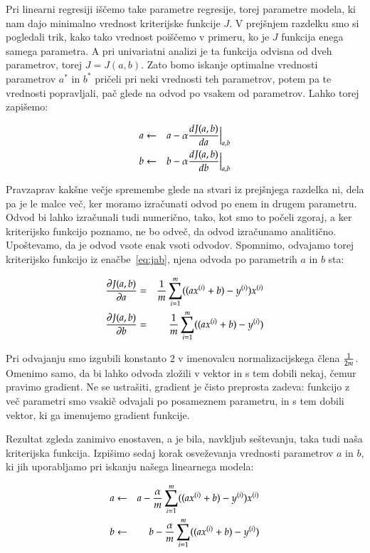 Pri linearni regresiji iščemo take parametre regresije, torej
parametre modela, ki nam dajo minimalno vrednost kriterijske funkcije
$J$. V prejšnjem razdelku smo si pogledali trik, kako tako vrednost
poiščemo v primeru, ko je $J$ funkcija enega samega parametra. A pri
univariatni analizi je ta funkcija odvisna od dveh parametrov, torej
$J=J(a,b)$. Zato bomo iskanje optimalne vrednosti parametrov $a^*$ in
$b^*$ pričeli pri neki vrednosti teh parametrov, potem pa te vrednosti
popravljali, pač glede na odvod po vsakem od parametrov. Lahko torej
zapišemo:

\begin{eqnarray}
a & \leftarrow & a - \alpha {dJ(a,b)\over da}\Bigr|_{a,b} \\
b & \leftarrow & b - \alpha {dJ(a,b)\over db}\Bigr|_{a,b}
\end{eqnarray}

Pravzaprav kakšne večje spremembe glede na stvari iz prejšnjega
razdelka ni, dela pa je le malce več, ker moramo izračunati odvod po
enem in drugem parametru. Odvod bi lahko izračunali tudi numerično,
tako, kot smo to počeli zgoraj, a ker kriterijsko funkcijo poznamo, ne
bo odveč, da odvod izračunamo analitično. Upoštevamo, da je odvod
vsote enak vsoti odvodov. Spomnimo, odvajamo torej kriterijsko
funkcijo iz enačbe~\ref{eq:jab}, njena odvoda po parametrih $a$ in $b$ sta:

\begin{eqnarray}
  {\partial J(a,b)\over\partial a} &=& {1\over m}\sum_{i=1}^m((a x^{(i)} + b)-y^{(i)})x^{(i)} \\
  {\partial J(a,b)\over\partial b} &=& {1\over m}\sum_{i=1}^m((a x^{(i)} + b)-y^{(i)})
\end{eqnarray}

Pri odvajanju smo izgubili konstanto $2$ v imenovalcu
normalizacijskega člena $1\over 2m$. Omenimo samo, da bi lahko odvoda
zložili v vektor in s tem dobili nekaj, čemur pravimo gradient. Ne se
ustrašiti, gradient je čisto preprosta zadeva: funkcijo z več parametri
smo vsakič odvajali po posameznem parametru, in s tem dobili vektor,
ki ga imenujemo gradient funkcije.

Rezultat zgleda zanimivo enostaven, a je bila, navkljub seštevanju,
taka tudi naša kriterijska funkcija. Izpišimo sedaj korak osveževanja
vrednosti parametrov $a$ in $b$, ki jih uporabljamo pri iskanju našega
linearnega modela:

\begin{eqnarray}
a & \leftarrow & a - {\alpha\over m}\sum_{i=1}^m((a x^{(i)} + b)-y^{(i)})x^{(i)} \\
b & \leftarrow & b - {\alpha\over m}\sum_{i=1}^m((a x^{(i)} + b)-y^{(i)})
\end{eqnarray}

